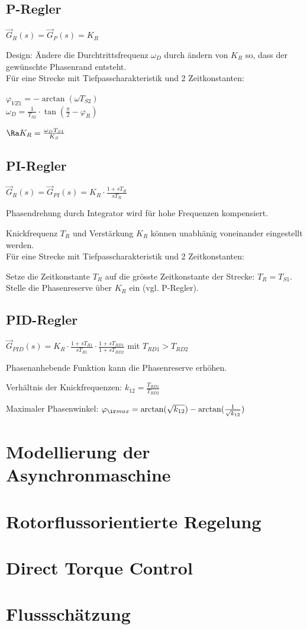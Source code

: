 \documentclass[fs, german]{latex4ei_fs}
\begin{document}
\subsection{P-Regler}
$\vec G_R (s) = \vec G_P (s) = K_R$

Design: Ändere die Durchtrittsfrequenz $\omega_D$ durch ändern von $K_R$ so, dass der gewünschte Phasenrand entsteht. \\

Für eine Strecke mit Tiefpasscharakteristik und 2 Zeitkonstanten:

$\varphi_{VZ1} = - \arctan (\omega T_{S2})$ \\
$\omega_D = \frac{1}{T_{S2}} \cdot \tan (\frac{\pi}{2} - \varphi_R)$

$\Ra K_R = \frac{\omega_D T_{S1}}{K_S}$

\subsection{PI-Regler}

$\vec G_R (s) = \vec G_{PI} (s) = K_R \cdot \frac{1 + s T_R}{s T_R}$  

Phasendrehung durch Integrator wird für hohe Frequenzen kompensiert.

Knickfrequenz $T_R$ und Verstärkung $K_R$ können unabhänig voneinander eingestellt werden. \\

Für eine Strecke mit Tiefpasscharakteristik und 2 Zeitkonstanten:

Setze die Zeitkonstante $T_R$ auf die grösste Zeitkonstante der Strecke:
$T_R = T_{S1}$. Stelle die Phasenreserve über $K_R$ ein (vgl. P-Regler).

\subsection{PID-Regler}

$\vec G_{PID} (s) = K_R \cdot \frac{1 + s T_{R1}}{s T_{R1}} \cdot \frac{1 + s T_{RD1}}{1 + s T_{RD2}}$ mit $T_{RD1} > T_{RD2}$ 

Phasenanhebende Funktion kann die Phasenreserve erhöhen.

Verhältnis der Knickfrequenzen: $k_{12} = \frac{T_{RD1}}{T_{RD2}}$

Maximaler Phasenwinkel: $\varphi_{\ir max} = \arctan (\sqrt{ k_{12}}) - \arctan (\frac{1}{\sqrt{k_{12}}})$

\section{Modellierung der Asynchronmaschine}

\section{Rotorflussorientierte Regelung} 

\section{Direct Torque Control} 

\section{Flussschätzung} 
\end{document}
